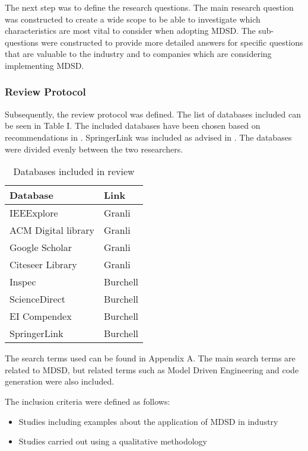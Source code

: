 \documentclass[10pt,twocolumn]{article}
\begin{document}
The next step was to define the research questions. The main research question was constructed to create a wide scope to be able to investigate which characteristics are most vital to consider when adopting MDSD. The sub-questions were constructed to provide more detailed answers for specific questions that are valuable to the industry and to companies which are considering implementing MDSD. 

\subsubsection{Review Protocol}
Subsequently, the review protocol was defined. The list of databases included can be seen in Table I. The included databases have been chosen based on recommendations in \cite{brereton2007lessons}. SpringerLink was included as advised in \cite{kitchenham2007guidelines}. The databases were divided evenly between the two researchers. 

\begin{table}[ht]
	\centering
	\begin{tabular}{|l|l|} 
		\hline
		\textbf{Database} & \textbf{Link}  \\
		\hline
		IEEExplore &  Granli \\
		\hline
		ACM Digital library &  Granli \\
		\hline
		Google Scholar &  Granli \\
		\hline
		Citeseer Library & Granli \\
		\hline
		Inspec &  Burchell \\
		\hline
		ScienceDirect & Burchell \\
		\hline
		EI Compendex &  Burchell \\
		\hline
		SpringerLink & Burchell \\
		\hline
	\end{tabular}
	\caption{Databases included in review}
\end{table}

The search terms used can be found in Appendix A. The main search terms are related to MDSD, but related terms such as Model Driven Engineering and code generation were also included. 

The inclusion criteria were defined as follows: \newline
\begin{itemize} 
\item Studies including examples about the application of MDSD in industry
\item Studies carried out using a qualitative methodology
\end{itemize}
\end{document}
